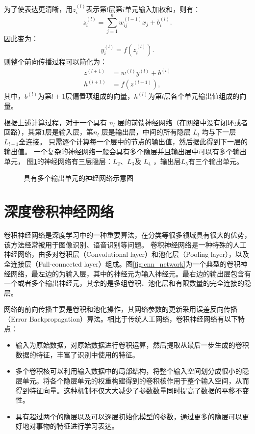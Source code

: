 为了使表达更清晰，用$ z^{(l)}_i $表示第$ l $层第$  i$单元输入加权和，则有：
\begin{equation}
  z_i^{(l)} = \sum_{j=1}^n w^{(l-1)}_{ij} x_j + b^{(l)}_i.
\end{equation}
因此变为：
\begin{equation}
  y^{(l)}_i = f(z^{(l)}_i).
\end{equation}
则整个前向传播过程可以简化为：
\begin{align}
  z^{(l+1)} &= w^{(l)} y^{(l)} + b^{(l)}   \\
  h^{(l+1)} &= f(z^{(l+1)}),
\end{align}
其中，$b^{(l)}$为第$l+1$层偏置项组成的向量，$h^{(l)}$为第$l$层各个单元输出值组成的向量。

根据上述计算过程，对于一个具有 $n_l$ 层的前馈神经网络（在网络中没有闭环或者回路），其第$   1 $层是输入层，第$n_l$ 层是输出层，中间的所有隐层 $L_l$ 均与下一层 $L_{l+1}$全连接。
只需逐个计算每一个层中的节点的输出值，然后据此得到下一层的输出值。
一个复杂的神经网络一般会具有多个隐层并且输出层中可以有多个输出单元，
图\ref{fig:network2}的神经网络有三层隐层：$  L_2 $、$ L_3$及 $ L_4$ ，输出层$  L_5 $有三个输出单元。

\begin{figure}[hbt]
  \centering
  \sWuhao
  
  \caption{具有多个输出单元的神经网络示意图}
  \label{fig:network2}
\end{figure}

\section{深度卷积神经网络}
\label{sec:cnn}
卷积神经网络是深度学习中的一种重要算法，在分类等很多领域具有很大的优势，该方法经常被用于图像识别、语音识别等问题。
卷积神经网络是一种特殊的人工神经网络，由多对卷积层（Convolutional layer）和池化层（Pooling layer），以及全连接层（Full-connected layer）组成。图\ref{fig:cnn_network}为一个典型的卷积神经网络，最左边的为输入层，其中的神经元为输入神经元。最右边的输出层包含有一个或者多个输出神经元，其余的是多组卷积、池化层和有限数量的完全连接的隐层。

网络的前向传播主要是卷积和池化操作，其网络参数的更新采用误差反向传播（Error Backpropagation）算法。相比于传统人工网络，卷积神经网络有以下特点：
\begin{itemize}
  \item 输入为原始数据，对原始数据进行卷积运算，然后提取从最后一步生成的卷积数据的特征，丰富了识别中使用的特征。
  \item 多个卷积核可以利用输入数据中的局部结构，将整个输入空间划分成很小的隐层单元。将各个隐层单元的权重构建得到的卷积核作用于整个输入空间，从而得到特征向量。这种机制不仅大大减少了参数数量同时提高了数据的平移不变性。
  \item 具有超过两个的隐层以及可以逐层初始化模型的参数，通过更多的隐层可以更好地对事物的特征进行学习表达。
\end{itemize}

